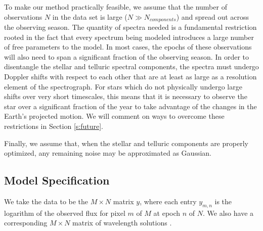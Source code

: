 \documentclass[twocolumn]{aastex62}
\begin{document}
To make our method practically feasible, we assume that the number of observations $N$ in the data set is large ($N \gg N_{components}$) and spread out across the observing season. 
The quantity of spectra needed is a fundamental restriction rooted in the fact that every spectrum being modeled introduces a large number of free parameters to the model. 
In most cases, the epochs of these observations will also need to span a significant fraction of the observing season. 
In order to disentangle the stellar and telluric spectral components, the spectra must undergo Doppler shifts with respect to each other that are at least as large as a resolution element of the spectrograph. 
For stars which do not physically undergo large \RV shifts over very short timescales, this means that it is necessary to observe the star over a significant fraction of the year to take advantage of the changes in the Earth's projected motion. 
We will comment on ways to overcome these restrictions in Section \ref{s:future}.

Finally, we assume that, when the stellar and telluric components are properly optimized, any remaining noise may be approximated as Gaussian. 

\subsection{Model Specification}
\label{s:model-eqns}

We take the data to be the $M \times N$ matrix $y$, where each entry $y_{m,n}$ is the logarithm of the observed flux for pixel $m$ of $M$ at epoch $n$ of $N$. 
We also have a corresponding $M \times N$ matrix of wavelength solutions .

\end{document}
